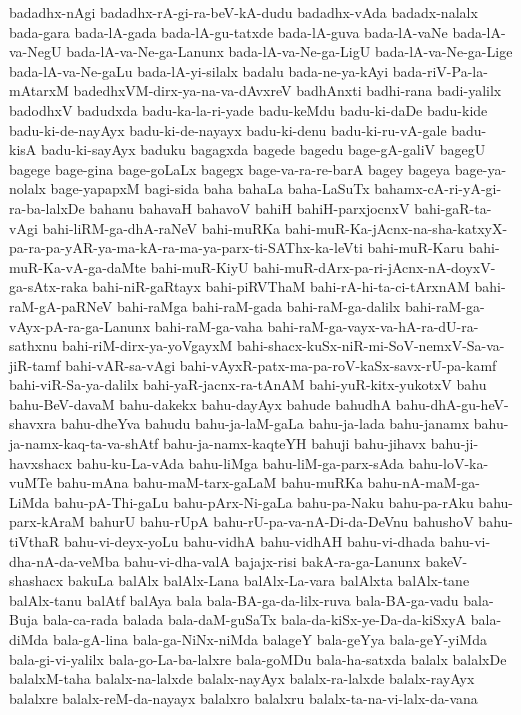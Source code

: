 {badadhx-nAgi
badadhx-rA-gi-ra-beV-kA-dudu
badadhx-vAda
badadx-nalalx
bada-gara
bada-lA-gada
bada-lA-gu-tatxde
bada-lA-guva
bada-lA-vaNe
bada-lA-va-NegU
bada-lA-va-Ne-ga-Lanunx
bada-lA-va-Ne-ga-LigU
bada-lA-va-Ne-ga-Lige
bada-lA-va-Ne-gaLu
bada-lA-yi-silalx
badalu
bada-ne-ya-kAyi
bada-riV-Pa-la-mAtarxM
badedhxVM-dirx-ya-na-va-dAvxreV
badhAnxti
badhi-rana
badi-yalilx
badodhxV
badudxda
badu-ka-la-ri-yade
badu-keMdu
badu-ki-daDe
badu-kide
badu-ki-de-nayAyx
badu-ki-de-nayayx
badu-ki-denu
badu-ki-ru-vA-gale
badu-kisA
badu-ki-sayAyx
baduku
bagagxda
bagede
bagedu
bage-gA-galiV
bagegU
bagege
bage-gina
bage-goLaLx
bagegx
bage-va-ra-re-barA
bagey
bageya
bage-ya-nolalx
bage-yapapxM
bagi-sida
baha
bahaLa
baha-LaSuTx
bahamx-cA-ri-yA-gi-ra-ba-lalxDe
bahanu
bahavaH
bahavoV
bahiH
bahiH-parxjocnxV
bahi-gaR-ta-vAgi
bahi-liRM-ga-dhA-raNeV
bahi-muRKa
bahi-muR-Ka-jAcnx-na-sha-katxyX-pa-ra-pa-yAR-ya-ma-kA-ra-ma-ya-parx-ti-SAThx-ka-leVti
bahi-muR-Karu
bahi-muR-Ka-vA-ga-daMte
bahi-muR-KiyU
bahi-muR-dArx-pa-ri-jAcnx-nA-doyxV-ga-sAtx-raka
bahi-niR-gaRtayx
bahi-piRVThaM
bahi-rA-hi-ta-ci-tArxnAM
bahi-raM-gA-paRNeV
bahi-raMga
bahi-raM-gada
bahi-raM-ga-dalilx
bahi-raM-ga-vAyx-pA-ra-ga-Lanunx
bahi-raM-ga-vaha
bahi-raM-ga-vayx-va-hA-ra-dU-ra-sathxnu
bahi-riM-dirx-ya-yoVgayxM
bahi-shacx-kuSx-niR-mi-SoV-nemxV-Sa-va-jiR-tamf
bahi-vAR-sa-vAgi
bahi-vAyxR-patx-ma-pa-roV-kaSx-savx-rU-pa-kamf
bahi-viR-Sa-ya-dalilx
bahi-yaR-jacnx-ra-tAnAM
bahi-yuR-kitx-yukotxV
bahu
bahu-BeV-davaM
bahu-dakekx
bahu-dayAyx
bahude
bahudhA
bahu-dhA-gu-heV-shavxra
bahu-dheYva
bahudu
bahu-ja-laM-gaLa
bahu-ja-lada
bahu-janamx
bahu-ja-namx-kaq-ta-va-shAtf
bahu-ja-namx-kaqteYH
bahuji
bahu-jihavx
bahu-ji-havxshacx
bahu-ku-La-vAda
bahu-liMga
bahu-liM-ga-parx-sAda
bahu-loV-ka-vuMTe
bahu-mAna
bahu-maM-tarx-gaLaM
bahu-muRKa
bahu-nA-maM-ga-LiMda
bahu-pA-Thi-gaLu
bahu-pArx-Ni-gaLa
bahu-pa-Naku
bahu-pa-rAku
bahu-parx-kAraM
bahurU
bahu-rUpA
bahu-rU-pa-va-nA-Di-da-DeVnu
bahushoV
bahu-tiVthaR
bahu-vi-deyx-yoLu
bahu-vidhA
bahu-vidhAH
bahu-vi-dhada
bahu-vi-dha-nA-da-veMba
bahu-vi-dha-valA
bajajx-risi
bakA-ra-ga-Lanunx
bakeV-shashacx
bakuLa
balAlx
balAlx-Lana
balAlx-La-vara
balAlxta
balAlx-tane
balAlx-tanu
balAtf
balAya
bala
bala-BA-ga-da-lilx-ruva
bala-BA-ga-vadu
bala-Buja
bala-ca-rada
balada
bala-daM-guSaTx
bala-da-kiSx-ye-Da-da-kiSxyA
bala-diMda
bala-gA-lina
bala-ga-NiNx-niMda
balageY
bala-geYya
bala-geY-yiMda
bala-gi-vi-yalilx
bala-go-La-ba-lalxre
bala-goMDu
bala-ha-satxda
balalx
balalxDe
balalxM-taha
balalx-na-lalxde
balalx-nayAyx
balalx-ra-lalxde
balalx-rayAyx
balalxre
balalx-reM-da-nayayx
balalxro
balalxru
balalx-ta-na-vi-lalx-da-vana
}

